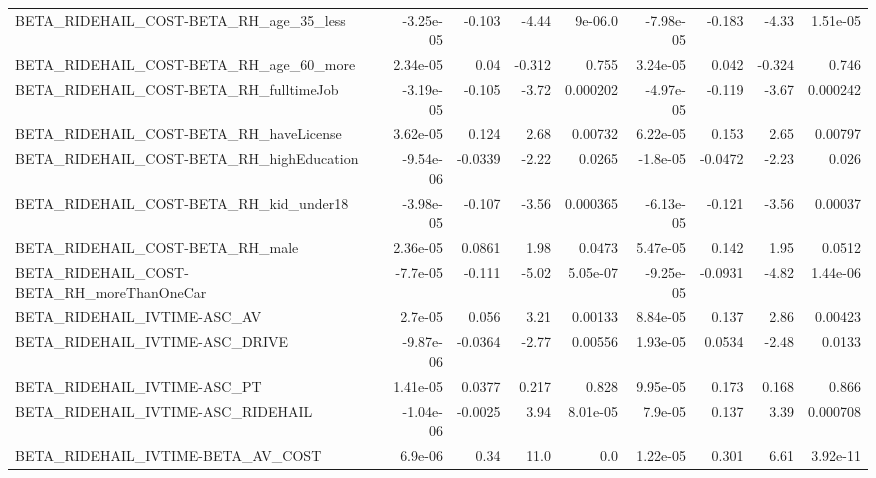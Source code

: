 \begin{tabular}{lrrrrrrrr}
BETA\_RIDEHAIL\_COST-BETA\_RH\_age\_35\_less             &   -3.25e-05 &       -0.103 &     -4.44 &  9e-06.0 &  -7.98e-05 &      -0.183 &        -4.33 &      1.51e-05 \\
BETA\_RIDEHAIL\_COST-BETA\_RH\_age\_60\_more             &    2.34e-05 &         0.04 &    -0.312 &    0.755 &   3.24e-05 &       0.042 &       -0.324 &         0.746 \\
BETA\_RIDEHAIL\_COST-BETA\_RH\_fulltimeJob             &   -3.19e-05 &       -0.105 &     -3.72 & 0.000202 &  -4.97e-05 &      -0.119 &        -3.67 &      0.000242 \\
BETA\_RIDEHAIL\_COST-BETA\_RH\_haveLicense             &    3.62e-05 &        0.124 &      2.68 &  0.00732 &   6.22e-05 &       0.153 &         2.65 &       0.00797 \\
BETA\_RIDEHAIL\_COST-BETA\_RH\_highEducation           &   -9.54e-06 &      -0.0339 &     -2.22 &   0.0265 &   -1.8e-05 &     -0.0472 &        -2.23 &         0.026 \\
BETA\_RIDEHAIL\_COST-BETA\_RH\_kid\_under18             &   -3.98e-05 &       -0.107 &     -3.56 & 0.000365 &  -6.13e-05 &      -0.121 &        -3.56 &       0.00037 \\
BETA\_RIDEHAIL\_COST-BETA\_RH\_male                    &    2.36e-05 &       0.0861 &      1.98 &   0.0473 &   5.47e-05 &       0.142 &         1.95 &        0.0512 \\
BETA\_RIDEHAIL\_COST-BETA\_RH\_moreThanOneCar          &    -7.7e-05 &       -0.111 &     -5.02 & 5.05e-07 &  -9.25e-05 &     -0.0931 &        -4.82 &      1.44e-06 \\
BETA\_RIDEHAIL\_IVTIME-ASC\_AV                        &     2.7e-05 &        0.056 &      3.21 &  0.00133 &   8.84e-05 &       0.137 &         2.86 &       0.00423 \\
BETA\_RIDEHAIL\_IVTIME-ASC\_DRIVE                     &   -9.87e-06 &      -0.0364 &     -2.77 &  0.00556 &   1.93e-05 &      0.0534 &        -2.48 &        0.0133 \\
BETA\_RIDEHAIL\_IVTIME-ASC\_PT                        &    1.41e-05 &       0.0377 &     0.217 &    0.828 &   9.95e-05 &       0.173 &        0.168 &         0.866 \\
BETA\_RIDEHAIL\_IVTIME-ASC\_RIDEHAIL                  &   -1.04e-06 &      -0.0025 &      3.94 & 8.01e-05 &    7.9e-05 &       0.137 &         3.39 &      0.000708 \\
BETA\_RIDEHAIL\_IVTIME-BETA\_AV\_COST                  &     6.9e-06 &         0.34 &      11.0 &      0.0 &   1.22e-05 &       0.301 &         6.61 &      3.92e-11 \\

\end{tabular}
